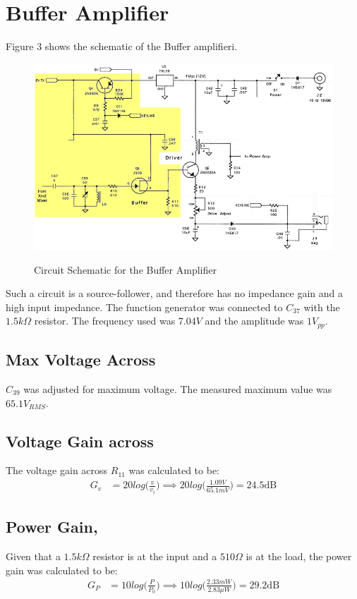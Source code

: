 \section{Buffer Amplifier}

Figure 3 shows the schematic of the Buffer amplifieri.

\begin{figure}[h!]
  \centering
  \includegraphics[scale=0.5]{./img/BuffAmp.png}
  \label{BuffAmp}
  \caption{Circuit Schematic for the Buffer Amplifier}
\end{figure}

Such a circuit is a source-follower, and therefore has no impedance gain and a
high input impedance. The function generator was connected to $C_{37}$ with
the $1.5k\Omega$ resistor. The frequency used was $7.04V$ and the amplitude was $1V_{pp}$.

\subsection{Max Voltage Across }
$C_{39}$ was adjusted for maximum voltage. The measured maximum value
was $\boxed{65.1 V_{RMS}}$.

\subsection{Voltage Gain  across }
The voltage gain across $R_{11}$ was calculated to be:
\begin{align*}
  G_v &= 20log\bigg( \frac{v}{v_i} \bigg)
      \implies 20log\bigg( \frac{1.09V}{65.1mV} \bigg)
      = \boxed{24.5 \text{dB}}
\end{align*}


\subsection{Power Gain, }
Given that a $1.5k\Omega$ resistor is at the input and a $510\Omega$ is
at the load, the power gain was calculated to be:
\begin{align*}
  G_P &= 10log\bigg( \frac{P}{P_0} \bigg)
      \implies 10log\bigg( \frac{2.33mW}{2.83\mu W} \bigg)
      = \boxed{29.2 \text{dB}}
\end{align*}


